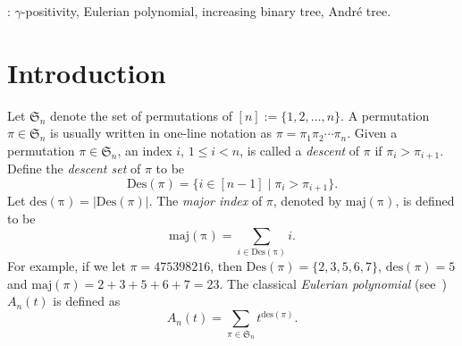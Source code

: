 \documentclass[12pt]{article}
\numberwithin{equation}{section}
\theoremstyle{plain}
\begin{document}
	
	\vskip0.1in
	:    $\gamma$-positivity, Eulerian polynomial, increasing binary tree, Andr\'e tree.
	
	
	
	
	
	
	
	
	\section{Introduction}
	
	
	
	Let $\mathfrak{S}_{n}$ denote the set of permutations of $[n]:=\{1,2,\ldots, n\}$. A permutation $\pi\in \mathfrak{S}_{n}$ is usually written in one-line notation as $\pi=\pi_1\pi_2\cdots \pi_n$. Given a permutation  $\pi\in \mathfrak{S}_{n}$,  an index $i$, $1\leq i< n$,  is called a  {\em descent  } of $\pi$ if $\pi_i>\pi_{i+1}$.    
	Define  the {\em descent set}  of $\pi$  to be
	$$
	\mathrm{Des}(\pi)=\{i\in[n-1]\mid \pi_i>\pi_{i+1}\}.
	$$
	Let $\mathrm{des(\pi)}=|\mathrm{Des}(\pi)|$.  
	The {\em major index} of $\pi$, denoted by $\mathrm{maj(\pi)}$, is defined to be
	$$
	\mathrm{maj(\pi)}=\sum\limits_{i\in \mathrm{Des(\pi)} } i.
	$$
	For example, if we let  $\pi=475398216$, then $\mathrm{Des}(\pi)=\{2,3,5,6,7\}$, $\mathrm{des}(\pi)=5$ and $\mathrm{maj}(\pi)=2+3+5+6+7=23$.
	The classical {\em Eulerian polynomial} (see~\cite[pp.~32-33]{ST})  $A_n(t)$ is  defined as 
	$$
	A_n(t)=\sum_{\pi\in \mathfrak{S}_{n}}t^{\mathrm{des}(\pi)}.
	$$
	
	
	  
\end{document}

